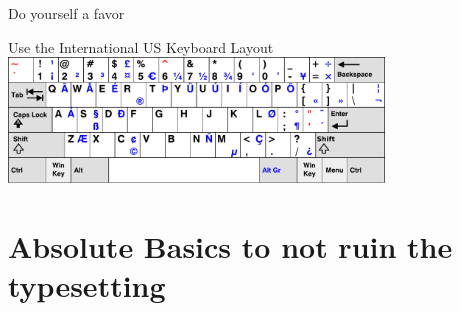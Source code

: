 \documentclass[xetex, onlymath, handout]{beamer}
\begin{document}
% 
% 

\begin{frame}{Do yourself a favor}
  \begin{alertblock}{Use the International US Keyboard Layout}
    \centering
    \vspace{3pt}
    \includegraphics[height=9em]{figs/kbd-us-intl}
  \end{alertblock}
\end{frame}

\section{Absolute Basics to not ruin the typesetting}
\end{document}
